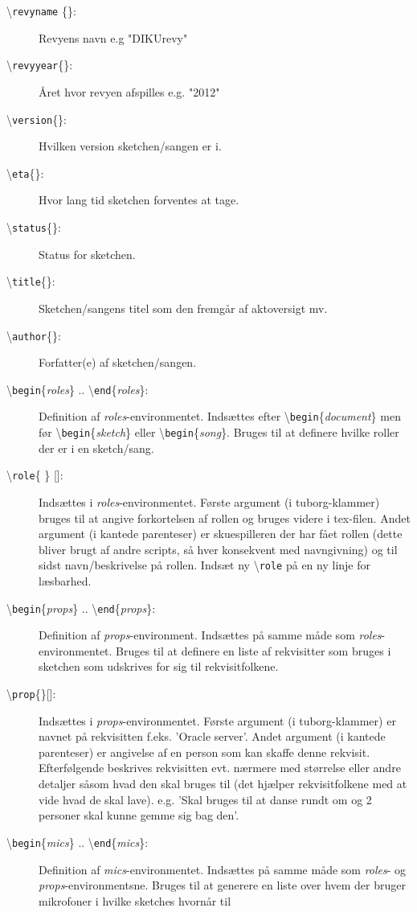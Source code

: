 \documentclass{article}
\newcommand{\env}[1]{\textit{#1}}
\newcommand{\cmd}[1]{\textbackslash \texttt{#1}}
\newcommand{\envbegin}[1]{\cmd{begin}\{\env{#1}\}}
\newcommand{\envend}[1]{\cmd{end}\{\env{#1}\}}
\begin{document}
\begin{description}
\item[\cmd{revyname} \{\}:] Revyens navn e.g "DIKUrevy"
\item[\cmd{revyyear}\{\}:] Året hvor revyen afspilles e.g. "2012"
\item[\cmd{version}\{\}:] Hvilken version sketchen/sangen er i.
\item[\cmd{eta}\{\}:] Hvor lang tid sketchen forventes at tage.
\item[\cmd{status}\{\}:] Status for sketchen.
\item[\cmd{title}\{\}:] Sketchen/sangens titel som den fremgår af aktoversigt mv.
\item[\cmd{author}\{\}:] Forfatter(e) af sketchen/sangen.
\item[\envbegin{roles} .. \envend{roles}:]
Definition af \env{roles}-environmentet.
Indsættes efter \envbegin{document} men før \envbegin{sketch} eller
\envbegin{song}. Bruges til at definere hvilke roller der er i en
sketch/sang.
\item[\cmd{role}\{ \} {[]}:] Indsættes i \env{roles}-environmentet. Første argument (i
tuborg-klammer) bruges
til at angive forkortelsen af rollen og bruges videre i tex-filen. Andet
argument (i kantede parenteser) er skuespilleren der har fået rollen (dette bliver brugt af
andre scripts, så hver konsekvent med navngivning) og til sidst navn/beskrivelse på
rollen. Indsæt ny \cmd{role} på en ny linje for læsbarhed.
\item[\envbegin{props} .. \envend{props}:] Definition af \env{props}-environment.
Indsættes på samme måde som \env{roles}-environmentet. Bruges til at
definere en liste af rekvisitter som bruges i sketchen som udskrives for
sig til rekvisitfolkene.
\item[\cmd{prop}\{\}{[]}:] Indsættes i \env{props}-environmentet. Første argument (i
tuborg-klammer) er navnet på rekvisitten f.eks. 'Oracle server'. Andet
argument (i kantede parenteser) er angivelse af en person som kan skaffe
denne rekvisit. Efterfølgende beskrives rekvisitten evt. nærmere med
størrelse eller andre detaljer såsom hvad den skal bruges til (det
hjælper rekvisitfolkene med at vide hvad de skal lave). e.g. 'Skal
bruges til at danse rundt om og 2 personer skal kunne gemme sig bag
den'.
\item[\envbegin{mics} .. \envend{mics}:] Definition af \env{mics}-environmentet.
Indsættes på samme måde som \env{roles}- og \env{props}-environmentsne. Bruges til at generere
en liste over hvem der bruger mikrofoner i hvilke sketches hvornår til

\end{description}
\end{document}
